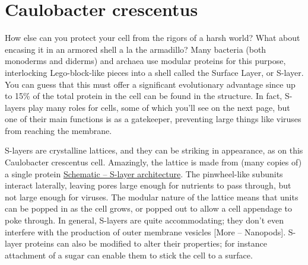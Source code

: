 \documentclass[]{book}
\begin{document}
\section{Caulobacter crescentus}\label{caulobacter-crescentus}

How else can you protect your cell from the rigors of a harsh world?
What about encasing it in an armored shell a la the armadillo? Many
bacteria (both monoderms and diderms) and archaea use modular proteins
for this purpose, interlocking Lego-block-like pieces into a shell
called the Surface Layer, or S-layer. You can guess that this must offer
a significant evolutionary advantage since up to 15\% of the total
protein in the cell can be found in the structure. In fact, S-layers
play many roles for cells, some of which you'll see on the next page,
but one of their main functions is as a gatekeeper, preventing large
things like viruses from reaching the membrane.

S-layers are crystalline lattices, and they can be striking in
appearance, as on this Caulobacter crescentus cell. Amazingly, the
lattice is made from (many copies of) a single protein
\protect\hyperlink{fig:2-6-1}{Schematic -- S-layer architecture}. The
pinwheel-like subunits interact laterally, leaving pores large enough
for nutrients to pass through, but not large enough for viruses. The
modular nature of the lattice means that units can be popped in as the
cell grows, or popped out to allow a cell appendage to poke through. In
general, S-layers are quite accommodating; they don't even interfere
with the production of outer membrane vesicles {[}More -- Nanopods{]}.
S-layer proteins can also be modified to alter their properties; for
instance attachment of a sugar can enable them to stick the cell to a
surface.
\end{document}
